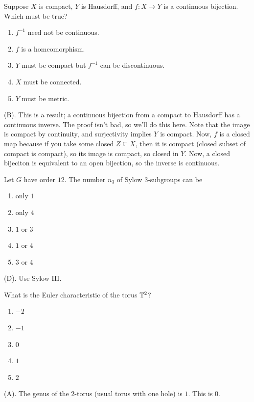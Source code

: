 \begin{exercise}
Suppose $X$ is compact, $Y$ is Hausdorff, and $f:X\to Y$ is a continuous bijection. Which must be true?
\begin{enumerate}[label=(\Alph*)]
    \item $f^{-1}$ need not be continuous.
    \item $f$ is a homeomorphism.
    \item $Y$ must be compact but $f^{-1}$ can be discontinuous.
    \item $X$ must be connected.
    \item $Y$ must be metric.
\end{enumerate}
\end{exercise}
\begin{solution}
(B). This is a result; a continuous bijection from a compact to Hausdorff has a continuous inverse.
The proof isn't bad, so we'll do this here. Note that the image is compact by continuity,
and surjectivity implies $Y$ is compact. Now, $f$ is a closed map because if you take
some closed $Z \subseteq X$, then it is compact (closed subset of compact is compact), so its image 
is compact, so closed in $Y$. Now, a closed bijeciton is equivalent to an open bijection,
so the inverse is continuous.
\end{solution}

\begin{exercise}
Let $G$ have order $12$. The number $n_3$ of Sylow $3$-subgroups can be
\begin{enumerate}[label=(\Alph*)]
    \item only $1$
    \item only $4$
    \item $1$ or $3$
    \item $1$ or $4$
    \item $3$ or $4$
\end{enumerate}
\end{exercise}
\begin{solution}
(D). Use Sylow III.
\end{solution}

\begin{exercise}
What is the Euler characteristic of the torus $\mathbb{T}^2$?
\begin{enumerate}[label=(\Alph*)]
    \item $-2$
    \item $-1$
    \item $0$
    \item $1$
    \item $2$
\end{enumerate}
\end{exercise}
\begin{solution}
(A). The genus of the $2$-torus (usual torus with one hole) is $1$. This is $0$.
\end{solution}


